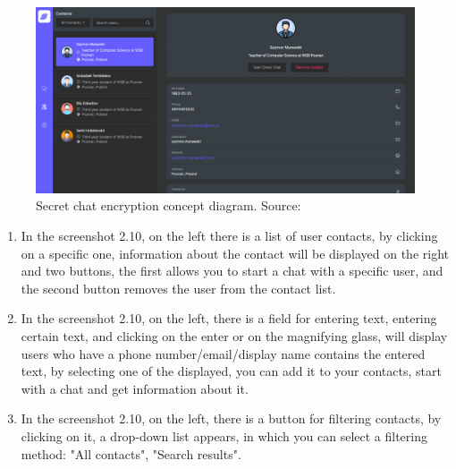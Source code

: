 \begin{figure}[H]
    \centering
    \includegraphics[width=1\textwidth]{Pictures/Messenger-2}
    \caption{Secret chat encryption concept diagram. Source: }\label{fig:figure10}
\end{figure}
\begin{enumerate}
    \item In the screenshot 2.10, on the left there is a list of user contacts, by clicking on a specific one,
    information about the contact will be displayed on the right and two buttons,
    the first allows you to start a chat with a specific user, and the second button removes the user from the contact list.
    \item In the screenshot 2.10, on the left, there is a field for entering text, entering certain text, and clicking on the enter or on the magnifying glass,
    will display users who have a phone number/email/display name contains the entered text,
    by selecting one of the displayed, you can add it to your contacts, start with a chat and get information about it.
    \item In the screenshot 2.10, on the left, there is a button for filtering contacts, by clicking on it, a drop-down list appears,
    in which you can select a filtering method: "All contacts", "Search results".
\end{enumerate}

